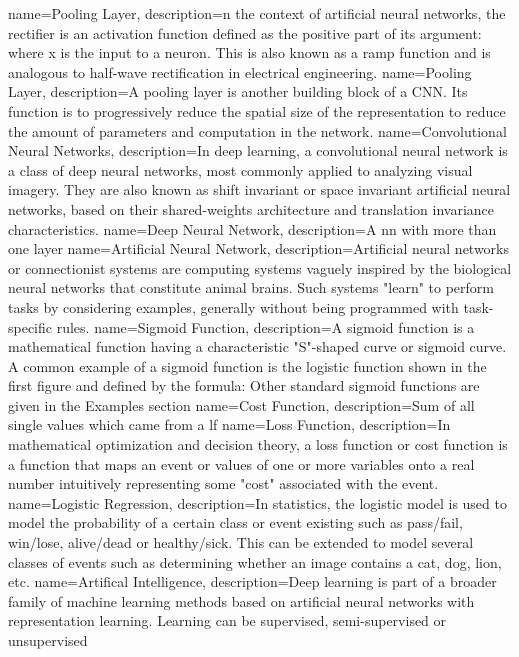 {
 name=Pooling Layer,
 description={n the context of artificial neural networks, the rectifier is an activation function defined as the positive part of its argument: where x is the input to a neuron. This is also known as a ramp function and is analogous to half-wave rectification in electrical engineering.}
}
{
 name=Pooling Layer,
 description={A pooling layer is another building block of a CNN. Its function is to progressively reduce the spatial size of the representation to reduce the amount of parameters and computation in the network. }
}
{
 name=Convolutional Neural Networks,
 description={In  deep learning, a convolutional neural network is a class of deep neural networks, most commonly applied to analyzing visual imagery. They are also known as shift invariant or space invariant artificial neural networks, based on their shared-weights architecture and translation invariance characteristics.}
}
{
 name=Deep Neural Network,
 description={A \Gls{nn} with more than one layer}
}
{
 name=Artificial Neural Network,
 description={Artificial neural networks or connectionist systems are computing systems vaguely inspired by the biological neural networks that constitute animal brains. Such systems "learn" to perform tasks by considering examples, generally without being programmed with task-specific rules.}
}
{
 name=Sigmoid Function,
 description={A sigmoid function is a mathematical function having a characteristic "S"-shaped curve or sigmoid curve. A common example of a sigmoid function is the logistic function shown in the first figure and defined by the formula: Other standard sigmoid functions are given in the Examples section}
}
{
 name=Cost Function,
 description={Sum of all single values which came from a \Gls{lf}}
}
{
 name=Loss Function,
 description={In mathematical optimization and decision theory, a loss function or cost function is a function that maps an event or values of one or more variables onto a real number intuitively representing some "cost" associated with the event.}
}
{
 name=Logistic Regression,
 description={In statistics, the logistic model is used to model the probability of a certain class or event existing such as pass/fail, win/lose, alive/dead or healthy/sick. This can be extended to model several classes of events such as determining whether an image contains a cat, dog, lion, etc.}
}
{
 name=Artifical Intelligence,
 description={Deep learning is part of a broader family of machine learning methods based on artificial neural networks with representation learning. Learning can be supervised, semi-supervised or unsupervised}
}
